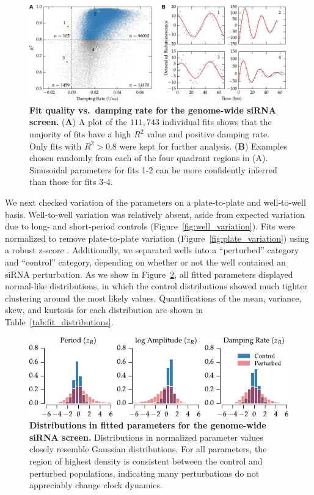 \documentclass[11pt, letterpaper]{article}
\begin{document}
\begin{figure}[tbp]
  \begin{center}
    \includegraphics[]{figures/pdfs/r2_vs_damping.pdf}
  \end{center}
  \caption{{\bfseries Fit quality vs.\ damping rate for the genome-wide siRNA screen.}
({\bfseries A}) A plot of the $111,743$ individual fits shows that the majority of fits have a high $R^2$ value and positive damping rate. Only fits with $R^2 > 0.8$ were kept for further analysis.
({\bfseries B}) Examples chosen randomly from each of the four quadrant regions in (A). Sinusoidal parameters for fits 1-2 can be more confidently inferred than those for fits 3-4.}
\label{fig:fit_quality}
\end{figure}

We next checked variation of the parameters on a plate-to-plate and well-to-well basis.
Well-to-well variation was relatively absent, aside from expected variation due to long- and short-period controls (Figure~\ref{fig:well_variation}).
Fits were normalized to remove plate-to-plate variation (Figure~\ref{fig:plate_variation}) using a robust z-score \cite{Birmingham2009}.
Additionally, we separated wells into a ``perturbed'' category and ``control'' category, depending on whether or not the well contained an siRNA perturbation.
As we show in Figure~\ref{fig:fit_distributions}, all fitted parameters displayed normal-like distributions, in which the control distributions showed much tighter clustering around the most likely values.
Quantifications of the mean, variance, skew, and kurtosis for each distribution are shown in Table~\ref{tab:fit_distributions}.

\begin{figure}[tbp]
  \begin{center}
    \includegraphics[]{figures/pdfs/fitted_parameters.pdf}
  \end{center}
  \caption{{\bfseries Distributions in fitted parameters for the genome-wide siRNA screen.} Distributions in normalized parameter values closely resemble Gaussian distributions. For all parameters, the region of highest density is consistent between the control and perturbed populations, indicating many perturbations do not appreciably change clock dynamics. } 
\label{fig:fit_distributions}
\end{figure}
\end{document}
